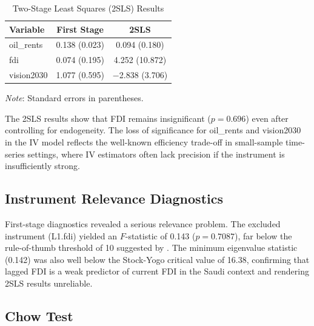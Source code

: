 \documentclass[12pt, a4paper]{article}
\begin{document}
\begin{table}[H]
\centering
\begin{threeparttable}
\caption{Two-Stage Least Squares (2SLS) Results}
\label{tab:2sls}
\begin{tabular}{lcc}
    \toprule
    \textbf{Variable} & \textbf{First Stage} & \textbf{2SLS} \\
    \midrule
    oil\_rents & 0.138 (0.023)  & 0.094 (0.180)    \\[4pt]
    fdi        & 0.074 (0.195)  & 4.252 (10.872)   \\[4pt]
    vision2030 & 1.077 (0.595)  & $-$2.838 (3.706) \\
    \bottomrule
\end{tabular}
\begin{tablenotes}
    \small
    \item \textit{Note}: Standard errors in parentheses.
\end{tablenotes}
\end{threeparttable}
\end{table}

The 2SLS results show that FDI remains insignificant ($p = 0.696$) even after controlling for endogeneity. The loss of significance for oil\_rents and vision2030 in the IV model reflects the well-known efficiency trade-off in small-sample time-series settings, where IV estimators often lack precision if the instrument is insufficiently strong.

\subsection{Instrument Relevance Diagnostics}

First-stage diagnostics revealed a serious relevance problem. The excluded instrument (L1.fdi) yielded an $F$-statistic of 0.143 ($p = 0.7087$), far below the rule-of-thumb threshold of 10 suggested by \citet{stock2002}. The minimum eigenvalue statistic (0.142) was also well below the Stock-Yogo critical value of 16.38, confirming that lagged FDI is a weak predictor of current FDI in the Saudi context and rendering 2SLS results unreliable.

\subsection{Chow Test}
\end{document}
